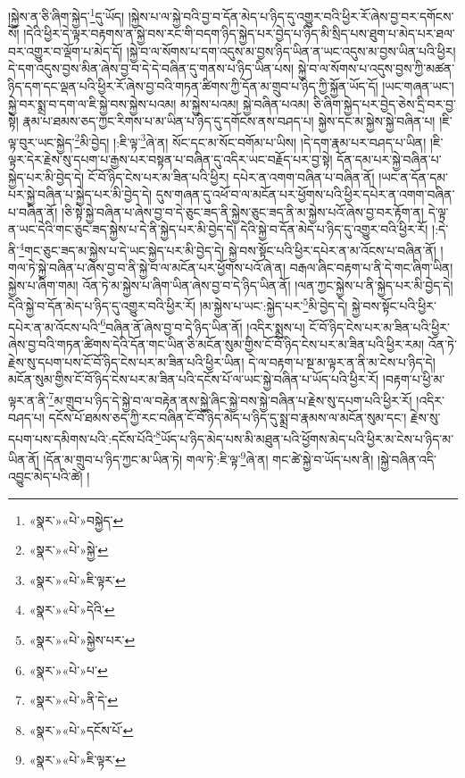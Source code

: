 །སྐྱེས་ན་ཅི་ཞིག་སྐྱེད་\footnote{«སྣར་»«པེ་»བསྐྱེད་}དུ་ཡོད། །སྐྱེས་པ་ལ་སྐྱེ་བའི་བྱ་བ་དོན་མེད་པ་ཉིད་དུ་འགྱུར་བའི་ཕྱིར་རོ་ཞེས་བྱ་བར་དགོངས་སོ། །དེའི་ཕྱིར་དེ་ལྟར་བརྟགས་ན་སྐྱེ་བས་རང་གི་བདག་ཉིད་སྐྱེད་པར་བྱེད་པ་ཉིད་མི་སྲིད་པས་ཐུག་པ་མེད་པར་ཐལ་བར་འགྱུར་བ་ལྡོག་པ་མེད་དོ། །སྐྱེ་བ་ལ་སོགས་པ་དག་འདུས་མ་བྱས་ཉིད་ཡིན་ན་ཡང་འདུས་མ་བྱས་ཡིན་པའི་ཕྱིར། དེ་དག་འདུས་བྱས་མིན་ཞེས་བྱ་བ་དེ་དེ་བཞིན་དུ་གནས་པ་ཉིད་ཡིན་པས། སྐྱེ་བ་ལ་སོགས་པ་འདུས་བྱས་ཀྱི་མཚན་ཉིད་དག་དང་ལྡན་པའི་ཕྱིར་རོ་ཞེས་བྱ་བའི་གཏན་ཚིགས་ཀྱི་དོན་མ་གྲུབ་པ་ཉིད་ཀྱི་སྐྱོན་ཡོད་དོ། །ཡང་གཞན་ཡང་། སྐྱེ་བར་སྨྲ་བ་དག་ལ་ཇི་སྐྱེ་བས་སྐྱེས་པའམ། མ་སྐྱེས་པའམ། སྐྱེ་བཞིན་པའམ། ཅི་ཞིག་སྐྱེད་པར་བྱེད་ཅེས་དྲི་བར་བྱ་སྟེ། རྣམ་པ་ཐམས་ཅད་ཀྱང་རིགས་པ་མ་ཡིན་པ་ཉིད་དུ་དགོངས་ནས་བཤད་པ། སྐྱེས་དང་མ་སྐྱེས་སྐྱེ་བཞིན་པ། །ཇི་ལྟ་བུར་ཡང་སྐྱེད་\footnote{«སྣར་»«པེ་»སྐྱེ་}མི་བྱེད། །:ཇི་ལྟ་\footnote{«སྣར་»«པེ་»ཇི་ལྟར་}ཞེ་ན། སོང་དང་མ་སོང་བགོམ་པ་ཡིས། །དེ་དག་རྣམ་པར་བཤད་པ་ཡིན། །ཇི་ལྟར་དེར་རྗེས་སུ་དཔག་པ་རྒྱས་པར་བསྟན་པ་བཞིན་དུ་འདིར་ཡང་བརྗོད་པར་བྱ་སྟེ། དོན་དམ་པར་སྐྱེ་བཞིན་པ་སྐྱེད་པར་མི་བྱེད་དེ། ངོ་བོ་ཉིད་ངེས་པར་མ་ཟིན་པའི་ཕྱིར། དཔེར་ན་འགག་བཞིན་པ་བཞིན་ནོ། །ཡང་ན་དོན་དམ་པར་སྐྱེ་བཞིན་པ་སྐྱེད་པར་མི་བྱེད་དེ། དུས་གཞན་དུ་འཕོ་བ་ལ་མངོན་པར་ཕྱོགས་པའི་ཕྱིར་དཔེར་ན་འགག་བཞིན་པ་བཞིན་ནོ། །ཅི་སྟེ་སྐྱེ་བཞིན་པ་ཞེས་བྱ་བ་དེ་ཅུང་ཟད་ནི་སྐྱེས་ཅུང་ཟད་ནི་མ་སྐྱེས་པའོ་ཞེས་བྱ་བར་རྟོག་ན། དེ་ལྟ་ན་ཡང་དེའི་གང་ཅུང་ཟད་སྐྱེས་པ་དེ་ནི་སྐྱེད་པར་མི་བྱེད་དེ། དེའི་སྐྱེ་བ་དོན་མེད་པ་ཉིད་དུ་འགྱུར་བའི་ཕྱིར་རོ། །:དེ་ནི་\footnote{«སྣར་»«པེ་»དེའི་}གང་ཅུང་ཟད་མ་སྐྱེས་པ་དེ་ཡང་སྐྱེད་པར་མི་བྱེད་དེ། སྐྱེ་བས་སྟོང་པའི་ཕྱིར་དཔེར་ན་མ་འོངས་པ་བཞིན་ནོ། །གལ་ཏེ་སྐྱེ་བཞིན་པ་ཞེས་བྱ་བ་ནི་སྐྱེ་བ་ལ་མངོན་པར་ཕྱོགས་པའོ་ཞེ་ན། བརྒལ་ཞིང་བརྟག་པ་ནི་དེ་གང་ཞིག་ཡིན། སྐྱེས་པ་ཞིག་གམ། འོན་ཏེ་མ་སྐྱེས་པ་ཞིག་ཡིན་ཞེས་བྱ་བ་དེ་ཉིད་ཡིན་ནོ། །ལན་ཀྱང་སྐྱེས་པ་ནི་སྐྱེད་པར་མི་བྱེད་དེ། དེའི་སྐྱེ་བ་དོན་མེད་པ་ཉིད་དུ་འགྱུར་བའི་ཕྱིར་རོ། །མ་སྐྱེས་པ་ཡང་:སྐྱེད་པར་\footnote{«སྣར་»«པེ་»སྐྱེས་པར་}མི་བྱེད་དེ། སྐྱེ་བས་སྟོང་པའི་ཕྱིར་དཔེར་ན་མ་འོངས་པའི་\footnote{«སྣར་»«པེ་»པ་}བཞིན་ནོ་ཞེས་བྱ་བ་དེ་ཉིད་ཡིན་ནོ། །འདིར་སྨྲས་པ། ངོ་བོ་ཉིད་ངེས་པར་མ་ཟིན་པའི་ཕྱིར་ཞེས་བྱ་བའི་གཏན་ཚིགས་དེའི་དོན་གང་ཡིན་ཅི་མངོན་སུམ་གྱིས་ངོ་བོ་ཉིད་ངེས་པར་མ་ཟིན་པའི་ཕྱིར་རམ། འོན་ཏེ་རྗེས་སུ་དཔག་པས་ངོ་བོ་ཉིད་ངེས་པར་མ་ཟིན་པའི་ཕྱིར་ཡིན། དེ་ལ་བརྟག་པ་སྔ་མ་ལྟར་ན་ནི་མ་ངེས་པ་ཉིད་དེ། མངོན་སུམ་གྱིས་ངོ་བོ་ཉིད་ངེས་པར་མ་ཟིན་པའི་དངོས་པོ་ལ་ཡང་སྐྱེ་བཞིན་པ་ཡོད་པའི་ཕྱིར་རོ། །བརྟག་པ་ཕྱི་མ་ལྟར་ན་ནི་\footnote{«སྣར་»«པེ་»ནི་དེ་}མ་གྲུབ་པ་ཉིད་དེ་སྐྱེ་བ་ལ་བརྟེན་ནས་སྐྱེ་ཞིང་སྐྱེ་བས་སྐྱེ་བཞིན་པ་རྗེས་སུ་དཔག་པའི་ཕྱིར་རོ། །འདིར་བཤད་པ། དངོས་པོ་ཐམས་ཅད་ཀྱི་རང་བཞིན་ངོ་བོ་ཉིད་མེད་པ་ཉིད་དུ་སྨྲ་བ་རྣམས་ལ་མངོན་སུམ་དང་། རྗེས་སུ་དཔག་པས་དམིགས་པའི་:དངོས་པོའི་\footnote{«སྣར་»«པེ་»དངོས་པོ་}ཡོད་པ་ཉིད་མེད་པས་མི་མཐུན་པའི་ཕྱོགས་མེད་པའི་ཕྱིར་མ་ངེས་པ་ཉིད་མ་ཡིན་ནོ། །དོན་མ་གྲུབ་པ་ཉིད་ཀྱང་མ་ཡིན་ཏེ། གལ་ཏེ་:ཇི་ལྟ་\footnote{«སྣར་»«པེ་»ཇི་ལྟར་}ཞེ་ན། གང་ཚེ་སྐྱེ་བ་ཡོད་པས་ནི། །སྐྱེ་བཞིན་འདི་འབྱུང་མེད་པའི་ཚེ། །
